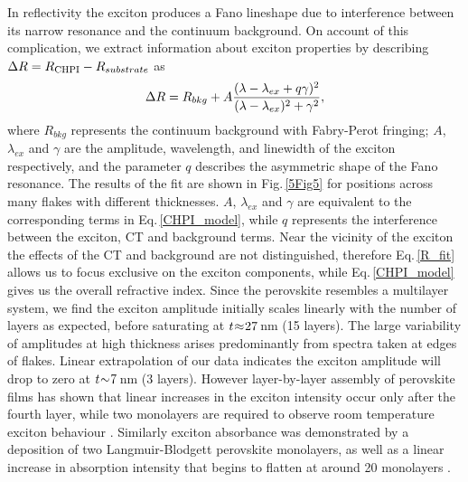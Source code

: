 In reflectivity the exciton produces a Fano lineshape due to interference between its narrow resonance and the continuum background. On account of this complication, we extract information about exciton properties by describing $\Delta R = R_{\textnormal{CHPI}} - R_{substrate}$ as
\begin{equation}
\centering
\Delta R = R_{bkg} + A\frac{(\lambda - \lambda_{ex} + q\gamma)^2}{(\lambda - \lambda_{ex})^2 + \gamma^2} , 
\label{R_fit}
\end{equation}
where $R_{bkg}$ represents the continuum background with Fabry-Perot fringing; $A$, $\lambda_{ex}$ and $\gamma$ are the amplitude, wavelength, and linewidth of the exciton respectively, and the parameter $q$ describes the asymmetric shape of the Fano resonance. The results of the fit are shown in Fig.\,\ref{5Fig5} for positions across many flakes with different thicknesses. $A$, $\lambda_{ex}$ and $\gamma$ are equivalent to the corresponding terms in Eq.\,\ref{CHPI_model}, while $q$ represents the interference between the exciton, CT and background terms. Near the vicinity of the exciton the effects of the CT and background are not distinguished, therefore Eq.\,\ref{R_fit} allows us to focus exclusive on the exciton components, while Eq.\,\ref{CHPI_model} gives us the overall refractive index. Since the perovskite resembles a multilayer system, we find the exciton amplitude initially scales linearly with the number of layers as expected, before saturating at $t\negmedspace\approx\negmedspace27$\,nm (15 layers). The large variability of amplitudes at high thickness arises predominantly from spectra taken at edges of flakes. Linear extrapolation of our data indicates the exciton amplitude will drop to zero at $t\negmedspace\sim\negmedspace7$\,nm (3 layers). However layer-by-layer assembly of perovskite films has shown that linear increases in the exciton intensity occur only after the fourth layer, while two monolayers are required to observe room temperature exciton behaviour \cite{Matsui2002}. %
Similarly exciton absorbance was demonstrated by a deposition of two Langmuir-Blodgett perovskite monolayers, as well as a linear increase in absorption intensity that begins to flatten at around 20 monolayers \cite{Era2000}. %

